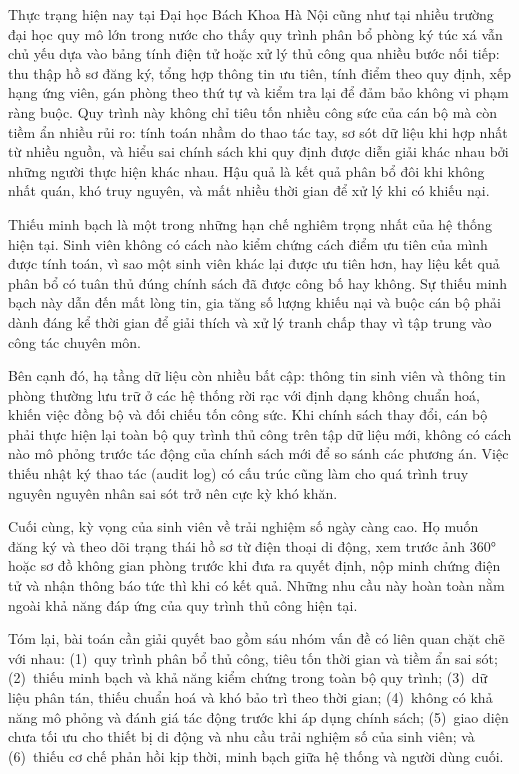 \documentclass[../DoAn.tex]{subfiles}
\begin{document}
Thực trạng hiện nay tại Đại học Bách Khoa Hà Nội cũng như tại nhiều trường đại
học quy mô lớn trong nước cho thấy quy trình phân bổ phòng ký túc xá vẫn chủ
yếu dựa vào bảng tính điện tử hoặc xử lý thủ công qua nhiều bước nối tiếp: thu
thập hồ sơ đăng ký, tổng hợp thông tin ưu tiên, tính điểm theo quy định, xếp
hạng ứng viên, gán phòng theo thứ tự và kiểm tra lại để đảm bảo không vi phạm
ràng buộc. Quy trình này không chỉ tiêu tốn nhiều công sức của cán bộ mà còn
tiềm ẩn nhiều rủi ro: tính toán nhầm do thao tác tay, sơ sót dữ liệu khi hợp
nhất từ nhiều nguồn, và hiểu sai chính sách khi quy định được diễn giải khác
nhau bởi những người thực hiện khác nhau. Hậu quả là kết quả phân bổ đôi khi
không nhất quán, khó truy nguyên, và mất nhiều thời gian để xử lý khi có khiếu
nại.

Thiếu minh bạch là một trong những hạn chế nghiêm trọng nhất của hệ thống hiện
tại. Sinh viên không có cách nào kiểm chứng cách điểm ưu tiên của mình được
tính toán, vì sao một sinh viên khác lại được ưu tiên hơn, hay liệu kết quả phân
bổ có tuân thủ đúng chính sách đã được công bố hay không. Sự thiếu minh bạch
này dẫn đến mất lòng tin, gia tăng số lượng khiếu nại và buộc cán bộ phải dành
đáng kể thời gian để giải thích và xử lý tranh chấp thay vì tập trung vào công
tác chuyên môn.

Bên cạnh đó, hạ tầng dữ liệu còn nhiều bất cập: thông tin sinh viên và thông
tin phòng thường lưu trữ ở các hệ thống rời rạc với định dạng không chuẩn hoá,
khiến việc đồng bộ và đối chiếu tốn công sức. Khi chính sách thay đổi, cán bộ
phải thực hiện lại toàn bộ quy trình thủ công trên tập dữ liệu mới, không có
cách nào mô phỏng trước tác động của chính sách mới để so sánh các phương án.
Việc thiếu nhật ký thao tác (audit log) có cấu trúc cũng làm cho quá trình truy
nguyên nguyên nhân sai sót trở nên cực kỳ khó khăn.

Cuối cùng, kỳ vọng của sinh viên về trải nghiệm số ngày càng cao. Họ muốn đăng
ký và theo dõi trạng thái hồ sơ từ điện thoại di động, xem trước ảnh 360° hoặc
sơ đồ không gian phòng trước khi đưa ra quyết định, nộp minh chứng điện tử và
nhận thông báo tức thì khi có kết quả. Những nhu cầu này hoàn toàn nằm ngoài
khả năng đáp ứng của quy trình thủ công hiện tại.

Tóm lại, bài toán cần giải quyết bao gồm sáu nhóm vấn đề có liên quan chặt chẽ
với nhau: (1)~quy trình phân bổ thủ công, tiêu tốn thời gian và tiềm ẩn sai sót;
(2)~thiếu minh bạch và khả năng kiểm chứng trong toàn bộ quy trình; (3)~dữ liệu
phân tán, thiếu chuẩn hoá và khó bảo trì theo thời gian; (4)~không có khả năng
mô phỏng và đánh giá tác động trước khi áp dụng chính sách; (5)~giao diện chưa
tối ưu cho thiết bị di động và nhu cầu trải nghiệm số của sinh viên; và
(6)~thiếu cơ chế phản hồi kịp thời, minh bạch giữa hệ thống và người dùng cuối.
\end{document}
